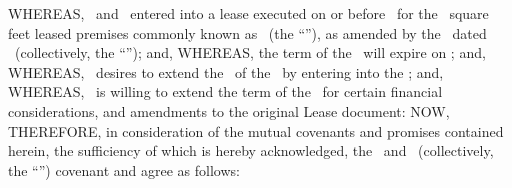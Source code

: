 \indent WHEREAS, \lessor\ and \lessee\ entered into a lease executed on or before \masterLeaseExecution\ for the \originalSQFT\ square feet leased premises commonly known as \premisesLocation\ (the “\premises”), as amended by the \firstAmend\ dated \firstAmendExecution\ (collectively, the “\lease”); and,
\newline
\indent WHEREAS, the term of the \lease\ will expire on \expDate; and,
\newline
\indent WHEREAS, \lessee\ desires to extend the \lease\ of the \premises\ by entering into the \optionTerm; and,
\newline
\indent WHEREAS, \lessor\ is willing to extend the term of the \lease\ for certain financial considerations, and amendments to the original Lease document:
\newline
\indent NOW, THEREFORE, in consideration of the mutual covenants and promises contained herein, the sufficiency of which is hereby acknowledged, the  \lessor\ and  \lessee\ (collectively, the “\parties”) covenant and agree as follows:
